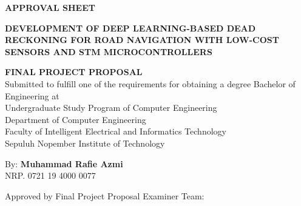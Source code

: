 \begin{center}
	\large
  \textbf{APPROVAL SHEET}
\end{center}

\thispagestyle{empty}

\begin{center}
  \textbf{DEVELOPMENT OF DEEP LEARNING-BASED DEAD RECKONING 
  FOR ROAD NAVIGATION 
  WITH LOW-COST SENSORS AND STM MICROCONTROLLERS}
\end{center}

\begingroup
  \small

  \begin{center}
    \textbf{FINAL PROJECT PROPOSAL} \\
    Submitted to fulfill one of the requirements for obtaining a degree
    Bachelor of Engineering at \\
    Undergraduate Study Program of Computer Engineering \\
    Department of Computer Engineering \\
    Faculty of Intelligent Electrical and Informatics Technology \\
    Sepuluh Nopember Institute of Technology \\
  \end{center}

  \begin{center}
    By: \textbf{Muhammad Rafie Azmi} \\
    NRP. 0721 19 4000 0077
  \end{center}

  \begin{center}
    Approved by Final Project Proposal Examiner Team:
  \end{center}

  \begingroup
    \setlength{\tabcolsep}{0pt}

